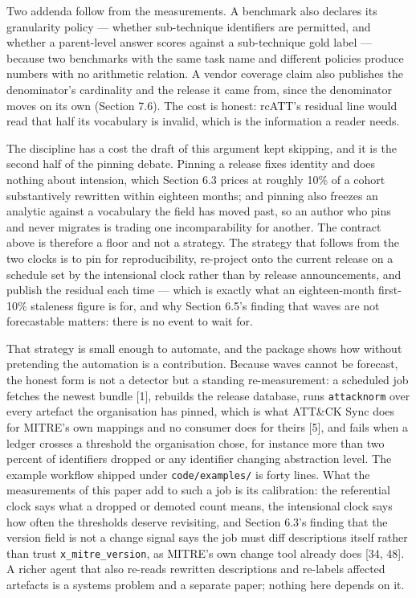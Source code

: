 \documentclass[11pt,a4paper]{article}
\begin{document}
Two addenda follow from the measurements. A benchmark also declares its granularity policy — whether sub-technique identifiers are permitted, and whether a parent-level answer scores against a sub-technique gold label — because two benchmarks with the same task name and different policies produce numbers with no arithmetic relation. A vendor coverage claim also publishes the denominator's cardinality and the release it came from, since the denominator moves on its own (Section 7.6). The cost is honest: rcATT's residual line would read that half its vocabulary is invalid, which is the information a reader needs.

The discipline has a cost the draft of this argument kept skipping, and it is the second half of the pinning debate. Pinning a release fixes identity and does nothing about intension, which Section 6.3 prices at roughly 10\% of a cohort substantively rewritten within eighteen months; and pinning also freezes an analytic against a vocabulary the field has moved past, so an author who pins and never migrates is trading one incomparability for another. The contract above is therefore a floor and not a strategy. The strategy that follows from the two clocks is to pin for reproducibility, re-project onto the current release on a schedule set by the intensional clock rather than by release announcements, and publish the residual each time — which is exactly what an eighteen-month first-10\% staleness figure is for, and why Section 6.5's finding that waves are not forecastable matters: there is no event to wait for.

That strategy is small enough to automate, and the package shows how without pretending the automation is a contribution. Because waves cannot be forecast, the honest form is not a detector but a standing re-measurement: a scheduled job fetches the newest bundle [1], rebuilds the release database, runs \texttt{attacknorm} over every artefact the organisation has pinned, which is what ATT\&CK Sync does for MITRE's own mappings and no consumer does for theirs [5], and fails when a ledger crosses a threshold the organisation chose, for instance more than two percent of identifiers dropped or any identifier changing abstraction level. The example workflow shipped under \texttt{code/examples/} is forty lines. What the measurements of this paper add to such a job is its calibration: the referential clock says what a dropped or demoted count means, the intensional clock says how often the thresholds deserve revisiting, and Section 6.3's finding that the version field is not a change signal says the job must diff descriptions itself rather than trust \texttt{x\_mitre\_version}, as MITRE's own change tool already does [34, 48]. A richer agent that also re-reads rewritten descriptions and re-labels affected artefacts is a systems problem and a separate paper; nothing here depends on it.
\end{document}
